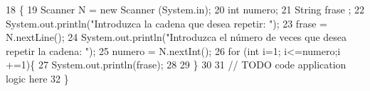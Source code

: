 \begin{DoxyCode}
18                                            \{
19         Scanner N = \textcolor{keyword}{new} Scanner (System.in);
20         \textcolor{keywordtype}{int} numero;
21         String frase ;
22         System.out.println(\textcolor{stringliteral}{"Introduzca la cadena que desea repetir: "});
23         frase = N.nextLine();
24         System.out.println(\textcolor{stringliteral}{"Introduzca el número de veces que desea repetir la cadena: "});
25         numero = N.nextInt();
26         \textcolor{keywordflow}{for} (\textcolor{keywordtype}{int} i=1; i<=numero;i +=1)\{
27             System.out.println(frase);
28             
29         \}
30         
31         \textcolor{comment}{// TODO code application logic here}
32     \}
\end{DoxyCode}
